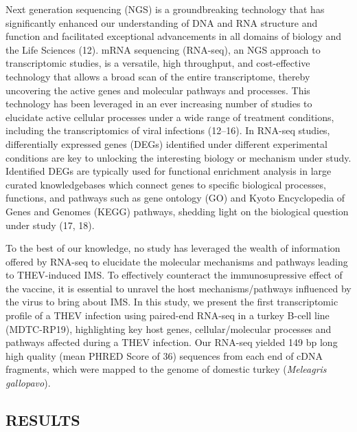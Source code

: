 \documentclass[
]{article}
\begin{document}
Next generation sequencing (NGS) is a groundbreaking technology that has
significantly enhanced our understanding of DNA and RNA structure and
function and facilitated exceptional advancements in all domains of
biology and the Life Sciences (12). mRNA sequencing (RNA-seq), an NGS
approach to transcriptomic studies, is a versatile, high throughput, and
cost-effective technology that allows a broad scan of the entire
transcriptome, thereby uncovering the active genes and molecular
pathways and processes. This technology has been leveraged in an ever
increasing number of studies to elucidate active cellular processes
under a wide range of treatment conditions, including the
transcriptomics of viral infections (12--16). In RNA-seq studies,
differentially expressed genes (DEGs) identified under different
experimental conditions are key to unlocking the interesting biology or
mechanism under study. Identified DEGs are typically used for functional
enrichment analysis in large curated knowledgebases which connect genes
to specific biological processes, functions, and pathways such as gene
ontology (GO) and Kyoto Encyclopedia of Genes and Genomes (KEGG)
pathways, shedding light on the biological question under study (17,
18).

To the best of our knowledge, no study has leveraged the wealth of
information offered by RNA-seq to elucidate the molecular mechanisms and
pathways leading to THEV-induced IMS. To effectively counteract the
immunosupressive effect of the vaccine, it is essential to unravel the
host mechanisms/pathways influenced by the virus to bring about IMS. In
this study, we present the first transcriptomic profile of a THEV
infection using paired-end RNA-seq in a turkey B-cell line (MDTC-RP19),
highlighting key host genes, cellular/molecular processes and pathways
affected during a THEV infection. Our RNA-seq yielded 149 bp long high
quality (mean PHRED Score of 36) sequences from each end of cDNA
fragments, which were mapped to the genome of domestic turkey
(\emph{Meleagris gallopavo}). \newpage

\subsection{RESULTS}\label{results}
\end{document}
